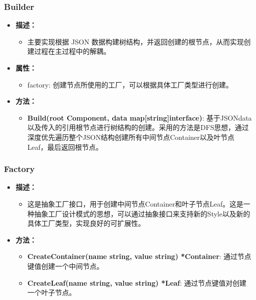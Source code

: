 \documentclass[hyperref,a4paper,UTF8]{ctexart}
\begin{document}
\subsubsection{Builder}
\begin{itemize}
    \item \textbf{描述：}
    \begin{itemize}
        \item 主要实现根据 JSON 数据构建树结构，并返回创建的根节点，从而实现创建过程在主过程中的解耦。
    \end{itemize}
    \item \textbf{属性：}
    \begin{itemize}
        \item factory: 创建节点所使用的工厂，可以根据具体工厂类型进行创建。
    \end{itemize}
    \item \textbf{方法：}
    \begin{itemize}
        \item \textbf{Build(root Component, data map[string]interface{})}: 基于JSONdata以及传入的引用根节点进行树结构的创建。采用的方法是DFS思想，通过深度优先遍历整个JSON结构创建所有中间节点Container以及叶节点Leaf，最后返回根节点。
    \end{itemize}
\end{itemize}

\subsubsection{Factory}
\begin{itemize}
    \item \textbf{描述：}
    \begin{itemize}
        \item 这是抽象工厂接口，用于创建中间节点Container和叶子节点Leaf。这是一种抽象工厂设计模式的思想，可以通过抽象接口来支持新的Style以及新的具体工厂类型，实现良好的可扩展性。
    \end{itemize}
    \item \textbf{方法：}
    \begin{itemize}
        \item \textbf{CreateContainer(name string, value string) *Container}: 通过节点键值创建一个中间节点。
        \item \textbf{CreateLeaf(name string, value string) *Leaf}: 通过节点键值对创建一个叶子节点。
    \end{itemize}
\end{itemize}
\end{document}
